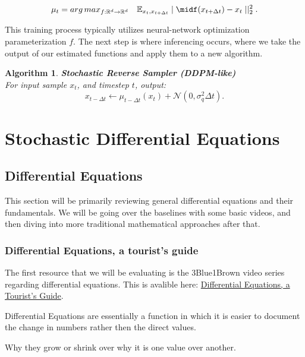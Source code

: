 \documentclass[10pt, oneside]{report}
\newcommand{\R}{\mathbb{R}}
\newcommand{\E}{\mathbb{E}}
\newtheorem{algo}{Algorithm}
\begin{document}
\[
	\mu_t = arg\,max_{f:\R^d \rightarrow \R^d}\ \ \ \E_{x_t, x_{t+\Delta t}}\mid\midf(x_{t+\Delta t}) - x_t  \mid\mid ^2_2
.\] 

This training process typically utilizes neural-network optimization parameterization $f$. The next step is where inferencing occurs, where we take the output of our estimated functions and apply them to a new algorithm.   
\begin{algo}
	\textbf{Stochastic Reverse Sampler (DDPM-like)}\\
	For input sample $x_t$, and timestep $t$, output:
\[
x_{t-\Delta t} \leftarrow \mu_{t-\Delta t}(x_t) + \mathcal{N}(0, \sigma^2_q \Delta t)
.\] 
\end{algo}


\chapter{Stochastic Differential Equations}
\section{Differential Equations}
This section will be primarily reviewing general differential equations and their fundamentals.  We will be going over the baselines with some basic videos, and then diving into more traditional mathematical approaches after that.  
\subsection{Differential Equations, a tourist's guide}
The first resource that we will be evaluating is the 3Blue1Brown video series regarding differential equations. This is avalible here: \href{https://www.youtube.com/watch?v=p_di4Zn4wz4&list=PLZHQObOWTQDNPOjrT6KVlfJuKtYTftqH6}{Differential Equations, a Tourist's Guide}.

Differential Equations are essentially a function in which it is easier to document the change in numbers rather then the direct values.  

Why they grow or shrink over why it is one value over another.
\end{document}
